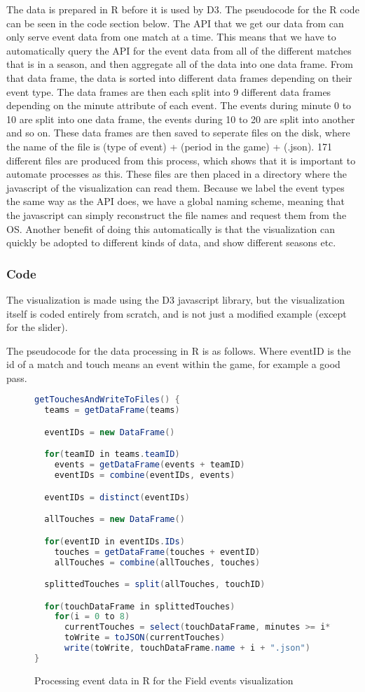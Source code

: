 \documentclass[Report.tex]{subfiles}
\begin{document}
The data is prepared in R before it is used by D3. The pseudocode for the R code can be seen in the code section below. The API that we get our data from can only serve event data from one match at a time. This means that we have to automatically query the API for the event data from all of the different matches that is in a season, and then aggregate all of the data into one data frame. From that data frame, the data is sorted into different data frames depending on their event type. The data frames are then each split into 9 different data frames depending on the minute attribute of each event. The events during minute 0 to 10 are split into one data frame, the events during 10 to 20 are split into another and so on. These data frames are then saved to seperate files on the disk, where the name of the file is (type of event) + (period in the game) + (.json). 171 different files are produced from this process, which shows that it is important to automate processes as this. These files are then placed in a directory where the javascript of the visualization can read them. Because we label the event types the same way as the API does, we have a global naming scheme, meaning that the javascript can simply reconstruct the file names and request them from the OS. Another benefit of doing this automatically is that the visualization can quickly be adopted to different kinds of data, and show different seasons etc.

\subsubsection{Code}
The visualization is made using the D3 javascript library, but the visualization itself is coded entirely from scratch, and is not just a modified example (except for the slider).

The pseudocode for the data processing in R is as follows.
Where eventID is the id of a match and touch means an event within the game, for example a good pass.

\begin{figure}
\begin{lstlisting}[language=java]
getTouchesAndWriteToFiles() {
  teams = getDataFrame(teams)

  eventIDs = new DataFrame()

  for(teamID in teams.teamID)
    events = getDataFrame(events + teamID)
    eventIDs = combine(eventIDs, events)

  eventIDs = distinct(eventIDs)

  allTouches = new DataFrame()

  for(eventID in eventIDs.IDs)
    touches = getDataFrame(touches + eventID)
    allTouches = combine(allTouches, touches)

  splittedTouches = split(allTouches, touchID)

  for(touchDataFrame in splittedTouches)
    for(i = 0 to 8)
      currentTouches = select(touchDataFrame, minutes >= i*10 AND minutes < (i + 1)*10)
      toWrite = toJSON(currentTouches)
      write(toWrite, touchDataFrame.name + i + ".json")
}
\end{lstlisting}
\caption{Processing event data in R for the Field events visualization}
\end{figure}
\end{document}

